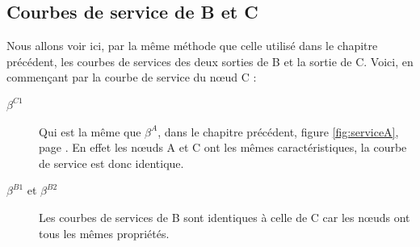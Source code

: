 \subsection{Courbes de service de B et C}
Nous allons voir ici, par la même méthode que celle utilisé dans le chapitre précédent, les courbes de services des deux sorties de B et la sortie de C. Voici, en commençant par la courbe de service du n\oe ud C :
\begin{description}
\item[$\beta^{C1}$] Qui est la même que $\beta^A$, dans le chapitre précédent, figure \ref{fig:serviceA}, page \pageref{fig:serviceA}. En effet les n\oe uds A et C ont les mêmes caractéristiques, la courbe de service est donc identique.
\item[$\beta^{B1}$ et $\beta^{B2}$] Les courbes de services de B sont identiques à celle de C car les n\oe uds ont tous les mêmes propriétés. 
\end{description}

